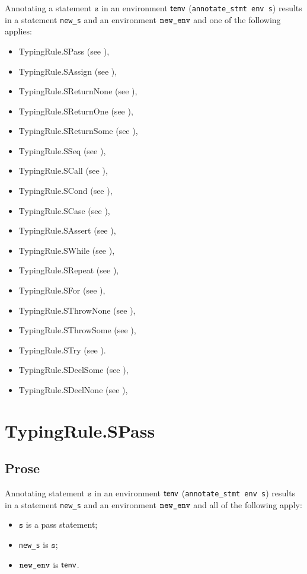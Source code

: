 \documentclass{book}
\newcommand\vs[0]{\texttt{s}}
\begin{document}
Annotating a statement $\vs$ in an environment $\textsf{tenv}$
(\texttt{annotate\_stmt env s}) results in a statement \texttt{new\_s} and an
environment $\texttt{new\_env}$ and one of the following applies:
\begin{itemize}
\item TypingRule.SPass (see ),
\item TypingRule.SAssign (see ),
\item TypingRule.SReturnNone (see ),
\item TypingRule.SReturnOne (see ),
\item TypingRule.SReturnSome (see ),
\item TypingRule.SSeq (see ),
\item TypingRule.SCall (see ),
\item TypingRule.SCond (see ),
\item TypingRule.SCase (see ),
\item TypingRule.SAssert (see ),
\item TypingRule.SWhile (see ),
\item TypingRule.SRepeat (see ),
\item TypingRule.SFor (see ),
\item TypingRule.SThrowNone (see ),
\item TypingRule.SThrowSome (see ),
\item TypingRule.STry (see ).
\item TypingRule.SDeclSome (see ),
\item TypingRule.SDeclNone (see ),
\end{itemize}

\section{TypingRule.SPass \label{sec:TypingRule.SPass}}

    \subsection{Prose}
Annotating statement $\vs$ in an environment $\textsf{tenv}$
(\texttt{annotate\_stmt env s}) results in a statement \texttt{new\_s} and an
environment $\texttt{new\_env}$ and all of the following apply:
    \begin{itemize}
    \item $\vs$ is a pass statement;
    \item \texttt{new\_s} is $\vs$;
    \item $\texttt{new\_env}$ is $\textsf{tenv}$.
    \end{itemize}
\end{document}
